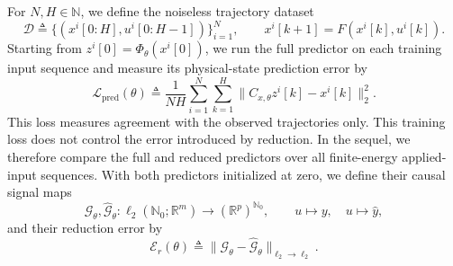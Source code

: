 \documentclass{l4dc2027}
\newcommand{\R}{\mathbb R}
\newcommand{\eqdef}{\triangleq}
\begin{document}
For \mbox{$N,H\in\mathbb N$}, we define the noiseless trajectory dataset
\begin{equation}\label{eq:data}
 \mathscr D\eqdef\{(x^i[0:H],u^i[0:H-1])\}_{i=1}^N,
 \qquad x^i[k+1]=F(x^i[k],u^i[k]).
\end{equation}
Starting from \mbox{$z^i[0]=\Phi_\theta(x^i[0])$}, we run the full predictor on each training input sequence and measure its physical-state prediction error by
\begin{equation}\label{eq:loss}
 \mathcal L_{\mathrm{pred}}(\theta)\eqdef
 \frac1{NH}\sum_{i=1}^N\sum_{k=1}^H
 \|C_{x,\theta}z^i[k]-x^i[k]\|_2^2.
\end{equation}
This loss measures agreement with the observed trajectories only.
This training loss does not control the error introduced by reduction.
In the sequel, we therefore compare the full and reduced predictors over all finite-energy applied-input sequences.
With both predictors initialized at zero, we define their causal signal maps
\[
 \mathcal G_\theta,\widehat{\mathcal G}_\theta:
 \ell_2(\mathbb N_0;\R^m)\longrightarrow(\R^p)^{\mathbb N_0},
 \qquad u\longmapsto y,\quad u\longmapsto\widehat y,
\]
and their reduction error by
\begin{equation}\label{eq:error}
 \mathcal E_r(\theta)\eqdef
 \|\mathcal G_\theta-\widehat{\mathcal G}_\theta\|_{\ell_2\to\ell_2}.
\end{equation}
\end{document}
